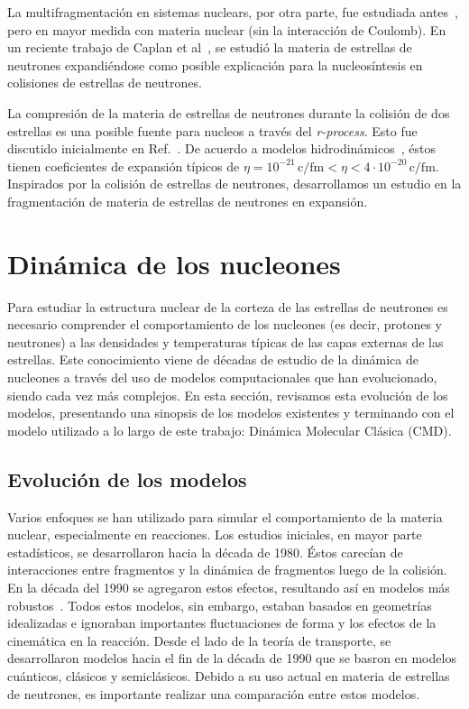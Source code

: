 La multifragmentación en sistemas nuclears, por otra parte, fue estudiada antes~\cite{bonasera_critical_2000, chikazumi_quantum_2001}, pero en mayor medida con materia nuclear (sin la interacción de Coulomb).
En un reciente trabajo de Caplan et al~\cite{caplan_pasta_2015}, se estudió la materia de estrellas de neutrones expandiéndose como posible explicación para la nucleosíntesis en colisiones de estrellas de neutrones.

La compresión de la materia de estrellas de neutrones durante la colisión de dos estrellas es una posible fuente para nucleos a través del \emph{r-process}.
Esto fue discutido inicialmente en Ref.~\cite{lattimer_black-hole-neutron-star_1974}.
De acuerdo a modelos hidrodinámicos~\cite{goriely_r-process_2011}, éstos tienen coeficientes de expansión típicos de  $\eta = 10^{-21}\,\text{c/fm} < \eta < 4\cdot 10^{-20}\,\text{c/fm}$.
Inspirados por la colisión de estrellas de neutrones, desarrollamos un estudio en la fragmentación de materia de estrellas de neutrones en expansión.

\section{Dinámica de los nucleones}\label{sc:nucleon}
Para estudiar la estructura nuclear de la corteza de las estrellas de neutrones es necesario comprender el comportamiento de los nucleones (es decir, protones y neutrones) a las densidades y temperaturas típicas de las capas externas de las estrellas.
Este conocimiento viene de décadas de estudio de la dinámica de nucleones a través del uso de modelos computacionales que han evolucionado, siendo cada vez más complejos.
En esta sección, revisamos esta evolución de los modelos, presentando una sinopsis de los modelos existentes y terminando con el modelo utilizado a lo largo de este trabajo: Dinámica Molecular Clásica (CMD).

\subsection{Evolución de los modelos}
Varios enfoques se han utilizado para simular el comportamiento de la materia nuclear, especialmente en reacciones.
Los estudios iniciales, en mayor parte estadísticos, se desarrollaron hacia la década de 1980.
Éstos carecían de interacciones entre fragmentos y la dinámica de fragmentos luego de la colisión.
En la década del 1990 se agregaron estos efectos, resultando así en modelos más robustos~\cite{barz_cluster_1996}.
Todos estos modelos, sin embargo, estaban basados en geometrías idealizadas e ignoraban importantes fluctuaciones de forma y los efectos de la cinemática en la reacción.
Desde el lado de la teoría de transporte, se desarrollaron modelos hacia el fin de la década de 1990 que se basron en modelos cuánticos, clásicos y semiclásicos.
Debido a su uso actual en materia de estrellas de neutrones, es importante realizar una comparación entre estos modelos.

